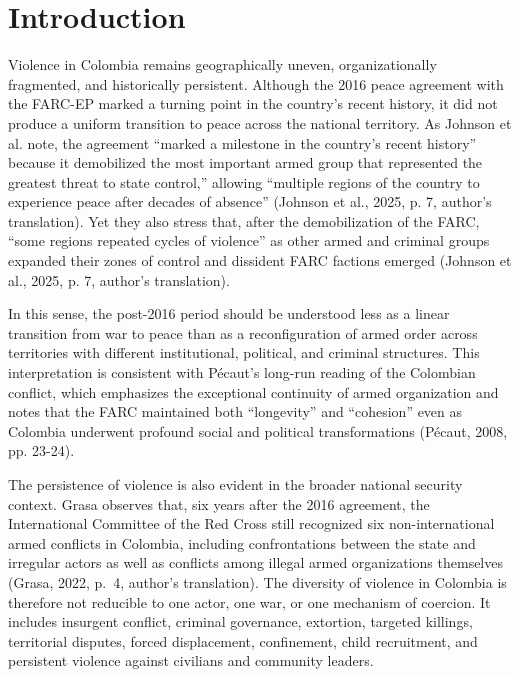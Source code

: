 \documentclass[11pt]{article}
\begin{document}
\newpage
\section{Introduction}\label{introduction}

Violence in Colombia remains geographically uneven, organizationally fragmented, and historically persistent. Although the 2016 peace agreement with the FARC-EP marked a turning point in the country's recent history, it did not produce a uniform transition to peace across the national territory. As Johnson et al. note, the agreement “marked a milestone in the country's recent history'' because it demobilized the most important armed group that represented the greatest threat to state control,'' allowing “multiple regions of the country to experience peace after decades of absence'' (Johnson et al., 2025, p. 7, author's translation). Yet they also stress that, after the demobilization of the FARC, “some regions repeated cycles of violence'' as other armed and criminal groups expanded their zones of control and dissident FARC factions emerged (Johnson et al., 2025, p. 7, author's translation). 

In this sense, the post-2016 period should be understood less as a linear transition from war to peace than as a reconfiguration of armed order across territories with different institutional, political, and criminal structures. This interpretation is consistent with Pécaut's long-run reading of the Colombian conflict, which emphasizes the exceptional continuity of armed organization and notes that the FARC maintained both “longevity'' and “cohesion'' even as Colombia underwent profound social and political transformations (Pécaut, 2008, pp. 23-24).

The persistence of violence is also evident in the broader national security context. Grasa observes that, six years after the 2016 agreement, the International Committee of the Red Cross still recognized six non-international armed conflicts in Colombia, including confrontations between the state and irregular actors as well as conflicts among illegal armed organizations themselves (Grasa, 2022, p.~4, author's translation). The diversity of violence in Colombia is therefore not reducible to one actor, one war, or one mechanism of coercion. It includes insurgent conflict, criminal governance, extortion, targeted killings, territorial disputes, forced displacement, confinement, child recruitment, and persistent violence against civilians and community leaders. 
\end{document}
